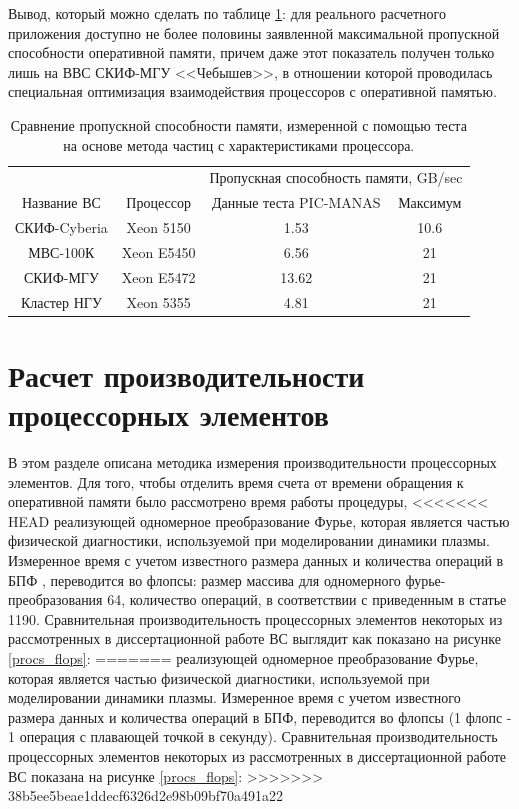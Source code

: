 Вывод, который можно сделать по таблице \ref{PIC_vs_PROC_RAM}: для реального расчетного приложения доступно не более половины заявленной максимальной пропускной способности оперативной памяти, причем даже этот показатель получен только лишь на ВВС СКИФ-МГУ <<Чебышев>>, в отношении которой проводилась специальная оптимизация взаимодействия процессоров с оперативной памятью.

\begin{table}[ht]
\caption{Сравнение пропускной способности памяти, измеренной с помощью теста на основе метода частиц с характеристиками процессора.}
\label{PIC_vs_PROC_RAM}
\begin{tabular}{|c|c|c|c|}
	\hline
             &            & \multicolumn{2}{|c|}{Пропускная способность памяти, GB/sec} \\ \cline{3-4}  	
Название ВС  & Процессор  & Данные теста PIC-MANAS & Максимум \\ \hline
СКИФ-Cyberia & Xeon 5150  &     1.53           & 10.6     \\ \hline
МВС-100К     & Xeon E5450 &     6.56           & 21       \\ \hline 
СКИФ-МГУ     & Xeon E5472 &     13.62          & 21       \\ \hline     
Кластер НГУ  & Xeon 5355  &     4.81           & 21       \\ \hline
\end{tabular}	
\end{table}

\section{Расчет производительности процессорных элементов}
\label{calc_PE}
В этом разделе описана методика измерения производительности процессорных элементов.
Для того, чтобы отделить время счета от времени обращения к оперативной памяти было рассмотрено время работы процедуры,
<<<<<<< HEAD
реализующей одномерное преобразование Фурье, которая является частью физической диагностики, используемой при моделировании динамики плазмы. Измеренное время с учетом известного размера данных и количества операций в БПФ \cite{FFT_OVS}, переводится во флопсы: размер массива для одномерного фурье-преобразования 64, количество операций, в соответствии с приведенным в статье \cite{FFT_OVS} 1190. Сравнительная производительность процессорных элементов некоторых из рассмотренных в диссертационной работе ВС выглядит как показано на рисунке  \ref{procs_flops}:
=======
реализующей одномерное преобразование Фурье, которая является частью физической диагностики, используемой при моделировании динамики плазмы. Измеренное время с учетом известного размера данных и количества операций в БПФ, переводится во флопсы (1 флопс - 1 операция с плавающей точкой в секунду). Сравнительная производительность процессорных элементов некоторых из рассмотренных в диссертационной работе ВС показана на рисунке  \ref{procs_flops}:
>>>>>>> 38b5ee5beae1ddecf6326d2e98b09bf70a491a22

